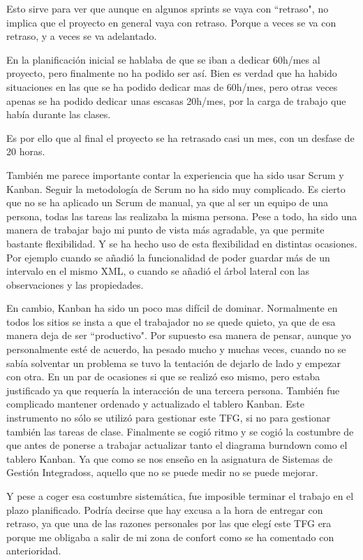Esto sirve para ver que aunque en algunos sprints se vaya con ``retraso", no implica que el proyecto
en general vaya con retraso. Porque a veces se va con retraso, y a veces se va adelantado.

En la planificaci\'on inicial se hablaba de que se iban a dedicar 60h/mes al proyecto,
pero finalmente no ha podido ser as\'i. Bien es verdad que ha habido situaciones en las
que se ha podido dedicar mas de 60h/mes, pero otras veces apenas se ha podido dedicar
unas escasas 20h/mes, por la carga de trabajo que hab\'ia durante las clases.

Es por ello que al final el proyecto se ha retrasado casi un mes, con un desfase de 20 horas.

Tambi\'en me parece importante contar la experiencia que ha sido usar Scrum y Kanban. 
Seguir la metodolog\'ia de Scrum no ha sido muy complicado. Es cierto que no se ha aplicado
un Scrum de manual, ya que al ser un equipo de una persona, todas las tareas las realizaba la 
misma persona. Pese a todo, ha sido una manera de trabajar bajo mi punto de vista m\'as agradable,
ya que permite bastante flexibilidad. Y se ha hecho uso de esta flexibilidad en distintas ocasiones.
Por ejemplo cuando se a\~nadi\'o la funcionalidad de poder guardar m\'as de un intervalo en el mismo
XML, o cuando se a\~nadi\'o el \'arbol lateral con las observaciones y las propiedades.

En cambio, Kanban ha sido un poco mas dif\'icil de dominar. Normalmente en todos los sitios se insta
a que el trabajador no se quede quieto, ya que de esa manera deja de ser ``productivo". Por supuesto
esa manera de pensar, aunque yo personalmente est\'e de acuerdo, ha pesado mucho y 
muchas veces, cuando no se sab\'ia solventar un problema se tuvo la tentaci\'on de dejarlo de lado
y empezar con otra. En un par de ocasiones si que se realiz\'o eso mismo, pero estaba justificado
ya que requer\'ia la interacci\'on de una tercera persona. Tambi\'en fue complicado mantener
ordenado y actualizado el tablero Kanban. Este instrumento no s\'olo se utiliz\'o para gestionar
este TFG, si no para gestionar tambi\'en las tareas de clase. Finalmente se cogi\'o ritmo
y se cogi\'o la costumbre de que antes de ponerse a trabajar actualizar tanto el diagrama burndown
como el tablero Kanban. Ya que como se nos ense\~no en la asignatura de Sistemas de Gesti\'on Integradoss,
aquello que no se puede medir no se puede mejorar.

Y pese a coger esa costumbre sistem\'atica, fue imposible terminar el trabajo en el
plazo planificado. Podr\'ia decirse que hay excusa a la hora de entregar con retraso,
ya que una de las razones personales por las que eleg\'i este TFG era porque me
obligaba a salir de mi zona de confort como se ha comentado con anterioridad.

